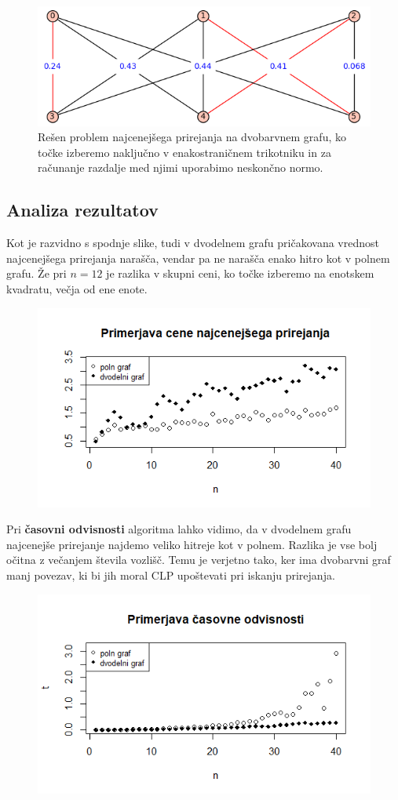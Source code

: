 \documentclass[a4paper, 11pt]{article}
\begin{document}
\begin{figure}[!htb]
    \includegraphics[scale=0.5]{dvobarvenclp}
    \centering
    \caption{Rešen problem najcenejšega prirejanja na dvobarvnem grafu, ko točke izberemo naključno v enakostraničnem trikotniku in za računanje razdalje med njimi uporabimo neskončno normo.}
    \label{fig:dvobarvenclp}
\end{figure}

\subsection{Analiza rezultatov}
Kot je razvidno s spodnje slike, tudi v dvodelnem grafu pričakovana vrednost najcenejšega prirejanja narašča, vendar pa ne narašča enako hitro kot v polnem grafu.
Že pri $n=12$ je razlika v skupni ceni, ko točke izberemo na enotskem kvadratu, večja od ene enote.
\begin{figure}[!htb]
    \includegraphics[scale=0.5]{primerjava_cene_polni_dvodelni}
    \centering
\end{figure}

Pri \textbf{časovni odvisnosti} algoritma lahko vidimo, da v dvodelnem grafu najcenejše prirejanje najdemo veliko hitreje kot v polnem.
Razlika je vse bolj očitna z večanjem števila vozlišč. 
Temu je verjetno tako, ker ima dvobarvni graf manj povezav, ki bi jih moral CLP upoštevati pri iskanju prirejanja.

\begin{figure}[!htb]
    \includegraphics[scale=0.65]{primerjava_cas_polni_dvodelni}
    \centering
\end{figure}
\end{document}

